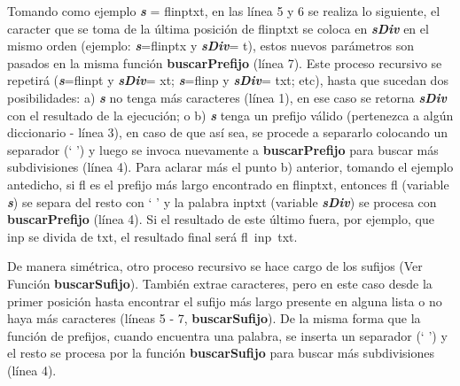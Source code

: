 Tomando como ejemplo \textit{\textbf{s}} = \textsf{flinptxt}, en las línea 5 y 6 se realiza lo siguiente, el caracter que se toma de la última posición de \textsf{flinptxt} se coloca en \textit{\textbf{sDiv}} en el mismo orden (ejemplo: \textit{\textbf{s}}=\textsf{flinptx} y \textit{\textbf{sDiv}}= \textsf{t}), estos nuevos parámetros son pasados en la misma función \textbf{buscarPrefijo} (línea 7). Este proceso recursivo se repetirá (\textit{\textbf{s}}=\textsf{flinpt} y \textit{\textbf{sDiv}}= \textsf{xt}; \textit{\textbf{s}}=\textsf{flinp} y \textit{\textbf{sDiv}}= \textsf{txt}; etc), hasta que sucedan dos posibilidades: a) \textit{\textbf{s}} no tenga más caracteres (línea 1), en ese caso se retorna \textit{\textbf{sDiv}} con el resultado de la ejecución; o b) \textit{\textbf{s}} tenga un prefijo válido (pertenezca a algún diccionario - línea 3), en caso de que así sea, se procede a separarlo colocando un separador (` ') y luego se invoca nuevamente a \mbox{\textbf{buscarPrefijo}} para buscar más subdivisiones (línea 4). Para aclarar más el punto b) anterior, tomando el ejemplo antedicho, si \textsf{fl} es el prefijo más largo encontrado en \textsf{flinptxt}, entonces \textsf{fl} (variable \textit{\textbf{s}}) se separa del resto con ` ' y la palabra \textsf{inptxt} (variable \textit{\textbf{sDiv}}) se procesa con \mbox{\textbf{buscarPrefijo}} (línea 4). Si el resultado de este último fuera, por ejemplo, que \textsf{inp} se divida de \textsf{txt}, el resultado final será \mbox{\textsf{fl inp txt}}.






De manera simétrica, otro proceso recursivo se hace cargo de los sufijos (Ver Función \textbf{buscarSufijo}). También extrae caracteres, pero en este caso desde la primer posición hasta encontrar el sufijo más largo presente en alguna lista o no haya más caracteres (líneas 5 - 7, \textbf{buscarSufijo}).
De la misma forma que la función de prefijos, cuando encuentra una palabra, se inserta un separador (` ') y el resto se procesa por la función \textbf{buscarSufijo} para buscar más subdivisiones (línea 4).

